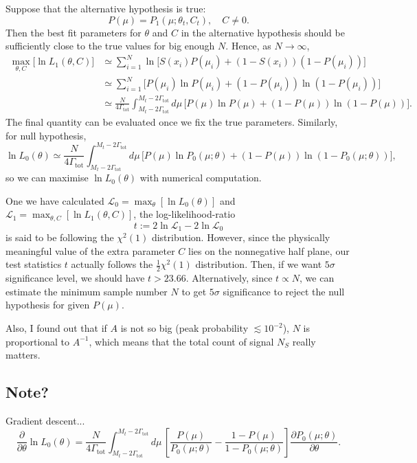\documentclass[10pt]{article}
\theoremstyle{definition}
\theoremstyle{remark}
\begin{document}
	Suppose that the alternative hypothesis is true:
	\[P(\mu)=P_{1}(\mu;\theta_{t},C_{t}),\quad C\neq0.\]
	Then the best fit parameters for $\theta$ and $C$ in the alternative hypothesis should be sufficiently close to the true values for big enough $N$.
	Hence, as $N\to\infty$,
	\begin{align*}
		\max_{\theta,C}\Big[\ln L_{1}(\theta,C)\Big]&\simeq\sum_{i=1}^{N}\ln\Big[S(x_{i})P(\mu_{i})+(1-S(x_{i}))(1-P(\mu_{i}))\Big]\\
		&\simeq\sum_{i=1}^{N}\Big[P(\mu_{i})\ln P(\mu_{i})+(1-P(\mu_{i}))\ln(1-P(\mu_{i}))\Big]\\
		&\simeq\frac{N}{4\Gamma_{\mathrm{tot}}}\int_{M_{t}-2\Gamma_{\mathrm{tot}}}^{M_{t}-2\Gamma_{\mathrm{tot}}}d\mu\,\Big[P(\mu)\ln P(\mu)+(1-P(\mu))\ln(1-P(\mu))\Big].
	\end{align*}
	The final quantity can be evaluated once we fix the true parameters.
	Similarly, for null hypothesis,
	\[\ln L_{0}(\theta)\simeq\frac{N}{4\Gamma_{\mathrm{tot}}}\int_{M_{t}-2\Gamma_{\mathrm{tot}}}^{M_{t}-2\Gamma_{\mathrm{tot}}}d\mu\,\Big[P(\mu)\ln P_{0}(\mu;\theta)+(1-P(\mu))\ln(1-P_{0}(\mu;\theta))\Big],\]
	so we can maximise $\ln L_{0}(\theta)$ with numerical computation.
	
	One we have calculated $\mathcal{L}_{0}=\max_{\theta}[\ln L_{0}(\theta)]$ and $\mathcal{L}_{1}=\max_{\theta,C}[\ln L_{1}(\theta,C)]$, the log-likelihood-ratio
	\[t:=2\ln\mathcal{L}_{1}-2\ln\mathcal{L}_{0}\]
	is said to be following the $\chi^{2}(1)$ distribution.
	However, since the physically meaningful value of the extra parameter $C$ lies on the nonnegative half plane, our test statistics $t$ actually follows the $\frac{1}{2}\chi^{2}(1)$ distribution\cite{cowan2011asymptotic}.
	Then, if we want $5\sigma$ significance level, we should have $t>23.66$.
	Alternatively, since $t\propto N$, we can estimate the minimum sample number $N$ to get $5\sigma$ significance to reject the null hypothesis for given $P(\mu)$.
	
	Also, I found out that if $A$ is not so big (peak probability $\lesssim 10^{-2}$), $N$ is proportional to $A^{-1}$, which means that the total count of signal $N_{S}$ really matters.
	
	\subsection{Note?}
	Gradient descent...
	\[\frac{\partial}{\partial\theta}\ln L_{0}(\theta)=\frac{N}{4\Gamma_{\mathrm{tot}}}\int_{M_{t}-2\Gamma_{\mathrm{tot}}}^{M_{t}-2\Gamma_{\mathrm{tot}}}d\mu\,\left[\frac{P(\mu)}{P_{0}(\mu;\theta)}-\frac{1-P(\mu)}{1-P_{0}(\mu;\theta)}\right]\frac{\partial P_{0}(\mu;\theta)}{\partial\theta}.\]
	
\end{document}
